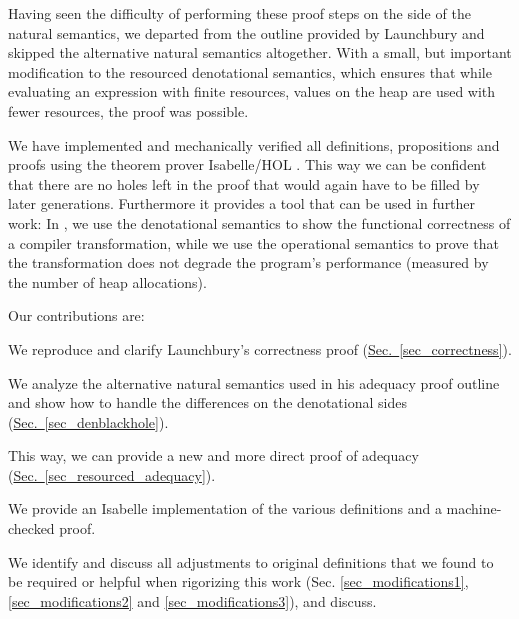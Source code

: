 \documentclass{jfp1}
\newcommand{\myref}[2]{\hyperref[#2]{#1~\ref*{#2}}}
\theoremstyle{nonumberbreak}
\begin{document}
Having seen the difficulty of performing these proof steps on the side of the natural semantics, we departed from the outline provided by Launchbury and skipped the alternative natural semantics altogether. With a small, but important modification to the resourced denotational semantics, which ensures that while evaluating an expression with finite resources, values on the heap are used with fewer resources, the proof was possible.

We have implemented and mechanically verified all definitions, propositions and proofs using the theorem prover Isabelle/HOL \cite{afp}. This way we can be confident that there are no holes left in the proof that would again have to be filled by later generations. Furthermore it provides a tool that can be used in further work: In \cite{arity-afp}, we use the denotational semantics to show the functional correctness of a compiler transformation, while we use the operational semantics to prove that the transformation does not degrade the program’s performance (measured by the number of heap allocations).


Our contributions are:
\begin{compactitem}
\item We reproduce and clarify Launchbury’s correctness proof (\myref{Sec.}{sec_correctness}).
\item We analyze the alternative natural semantics used in his adequacy proof outline and show how to handle the differences on the denotational sides (\myref{Sec.}{sec_denblackhole}).
\item This way, we can provide a new and more direct proof of adequacy (\myref{Sec.}{sec_resourced_adequacy}).
\item We provide an Isabelle implementation of the various definitions and a machine-checked proof.
\item We identify and discuss all adjustments to original definitions that we found to be required or helpful when rigorizing this work (Sec. \ref{sec_modifications1}, \ref{sec_modifications2} and \ref{sec_modifications3}), and discuss.
\end{compactitem}
\end{document}
